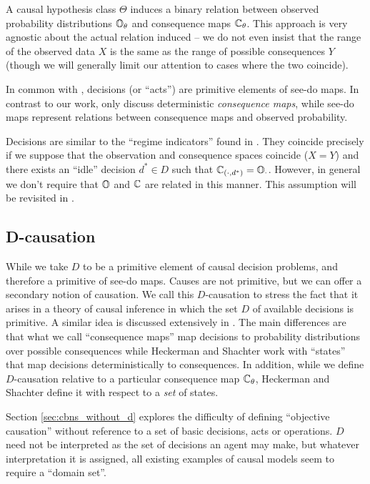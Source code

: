 A causal hypothesis class $\Theta$ induces a binary relation between observed probability distributions $\mathbb{O}_\theta$ and consequence maps $\mathbb{C}_\theta$. This approach is very agnostic about the actual relation induced -- we do not even insist that the range of the observed data $X$ is the same as the range of possible consequences $Y$ (though we will generally limit our attention to cases where the two coincide). 

In common with \citet{heckerman_decision-theoretic_1995}, decisions (or ``acts'') are primitive elements of see-do maps. In contrast to our work, \citet{heckerman_decision-theoretic_1995} only discuss deterministic \emph{consequence maps}, while see-do maps represent relations between consequence maps and observed probability.

Decisions are similar to the ``regime indicators'' found in \citet{dawid_decision-theoretic_2020}. They coincide precisely if we suppose that the observation and consequence spaces coincide ($X=Y$) and there exists an ``idle'' decision $d^*\in D$ such that $\mathbb{C}_{(\cdot,d^*)} = \mathbb{O}_{\cdot}$. However, in general we don't require that $\mathbb{O}$ and $\mathbb{C}$ are related in this manner. This assumption will be revisited in .

\subsection{D-causation}

While we take $D$ to be a primitive element of causal decision problems, and therefore a primitive of see-do maps. Causes are not primitive, but we can offer a secondary notion of causation. We call this $D$-causation to stress the fact that it arises in a theory of causal inference in which the set $D$ of available decisions is primitive. A similar idea is discussed extensively in \citet{heckerman_decision-theoretic_1995}. The main differences are that what we call ``consequence maps'' map decisions to probability distributions over possible consequences while Heckerman and Shachter work with ``states'' that map decisions deterministically to consequences. In addition, while we define $D$-causation relative to a particular consequence map $\mathbb{C}_\theta$, Heckerman and Shachter define it with respect to a \emph{set} of states.

Section \ref{sec:cbns_without_d} explores the difficulty of defining ``objective causation'' without reference to a set of basic decisions, acts or operations. $D$ need not be interpreted as the set of decisions an agent may make, but whatever interpretation it is assigned, all existing examples of causal models seem to require a ``domain set''.

